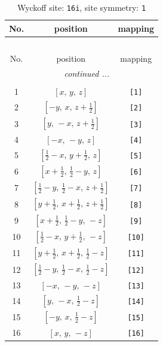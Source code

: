 \documentclass[fleqn,8pt]{jsarticle}
\begin{document}
\begin{longtable}{ccc}
\caption{Wyckoff site: {\tt 16i}, site symmetry: {\tt 1}}
 \\
 \hline \hline
No. & position & mapping \\ \hline \endfirsthead

\multicolumn{2}{l}{\tablename\ \thetable{}} \\
 \hline \hline
No. & position & mapping \\ \hline \endhead

 \hline \hline
\multicolumn{2}{r}{\footnotesize\it continued ...} \\ \endfoot

 \hline \hline
\multicolumn{2}{r}{} \\ \endlastfoot

1 & $\left[ x,\, y,\, z \right]$ & {\tt [1]} \\ \hline
2 & $\left[ - y,\, x,\, z + \frac{1}{2} \right]$ & {\tt [2]} \\ \hline
3 & $\left[ y,\, - x,\, z + \frac{1}{2} \right]$ & {\tt [3]} \\ \hline
4 & $\left[ - x,\, - y,\, z \right]$ & {\tt [4]} \\ \hline
5 & $\left[ \frac{1}{2} - x,\, y + \frac{1}{2},\, z \right]$ & {\tt [5]} \\ \hline
6 & $\left[ x + \frac{1}{2},\, \frac{1}{2} - y,\, z \right]$ & {\tt [6]} \\ \hline
7 & $\left[ \frac{1}{2} - y,\, \frac{1}{2} - x,\, z + \frac{1}{2} \right]$ & {\tt [7]} \\ \hline
8 & $\left[ y + \frac{1}{2},\, x + \frac{1}{2},\, z + \frac{1}{2} \right]$ & {\tt [8]} \\ \hline
9 & $\left[ x + \frac{1}{2},\, \frac{1}{2} - y,\, - z \right]$ & {\tt [9]} \\ \hline
10 & $\left[ \frac{1}{2} - x,\, y + \frac{1}{2},\, - z \right]$ & {\tt [10]} \\ \hline
11 & $\left[ y + \frac{1}{2},\, x + \frac{1}{2},\, \frac{1}{2} - z \right]$ & {\tt [11]} \\ \hline
12 & $\left[ \frac{1}{2} - y,\, \frac{1}{2} - x,\, \frac{1}{2} - z \right]$ & {\tt [12]} \\ \hline
13 & $\left[ - x,\, - y,\, - z \right]$ & {\tt [13]} \\ \hline
14 & $\left[ y,\, - x,\, \frac{1}{2} - z \right]$ & {\tt [14]} \\ \hline
15 & $\left[ - y,\, x,\, \frac{1}{2} - z \right]$ & {\tt [15]} \\ \hline
16 & $\left[ x,\, y,\, - z \right]$ & {\tt [16]} \\
\end{longtable}
\end{document}
